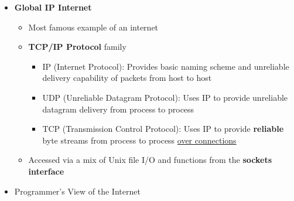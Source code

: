\documentclass[12pt]{article}
\begin{document}
{\begin{itemize}
	\begin{enumerate}
		\item Client on host A copies data from the client's VA space into kernel buffer (system call)
		\item Protocol SW on A creates \textit{LAN1 frame} by appending an internet header and a LAN1 frame header to the data (\textbf{Encapsulation})
		\item LAN1 adapter copies the frame to the network
		\item Router's LAN1 adapter reads the frame from the wire and passes it to the protocol SW
		\item Router fetches the destination address from the \textit{internet packet header} and uses it as an \textit{index into a routing table} to determine where to forward the packet. Remove LAN1 frame header and append LAN2 frame header, pass the result to adapter
		\item LAN2 adapter copies the frame to the network
		\item Host B's adapter reads the frame from the wire and passes it to the protocol SW
		\item Protocol SW on B strips of packet header and frame header. Eventually copies the resulting data into the server's VA space when a read system call is invoked
	\end{enumerate}
	\item \textbf{Global IP Internet}
	\begin{itemize}
		\item Most famous example of an internet
		\item \textbf{TCP/IP Protocol} family
		\begin{itemize}
			\item IP (Internet Protocol): Provides basic naming scheme and unreliable delivery capability of packets from host to host
			\item UDP (Unreliable Datagram Protocol): Uses IP to provide unreliable datagram delivery from process to process
			\item TCP (Transmission Control Protocol): Uses IP to provide \textbf{reliable} byte streams from process to process \underline{over connections}
		\end{itemize}
		\item Accessed via a mix of Unix file I/O and functions from the \textbf{sockets interface}
	\end{itemize}
	\item Programmer's View of the Internet
	\begin{itemize}

\end{itemize}
\end{itemize}}
\end{document}
